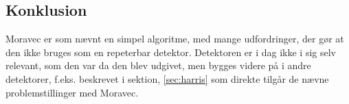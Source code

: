 \subsection{Konklusion}
Moravec er som nævnt en simpel algoritme, med mange udfordringer, der gør at den ikke bruges som en repeterbar detektor. Detektoren er i dag ikke i sig selv relevant, som den var da den blev udgivet, men bygges videre på i andre detektorer, f.eks. \cite{Harris} beskrevet i sektion, \ref{sec:harris} som direkte tilgår de nævne problemstillinger med Moravec.